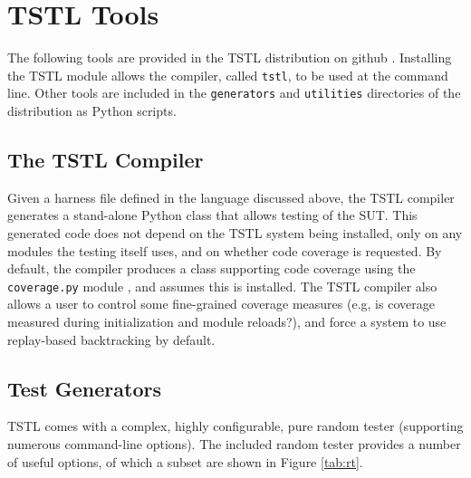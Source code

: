 \section{TSTL Tools}
\label{sec:tools}

The following tools are provided in the TSTL distribution on github \cite{tstl}.  Installing the TSTL module allows the compiler, called {\tt tstl}, to be used at the command line.  Other tools are included in the {\tt generators} and {\tt utilities} directories of the distribution as Python scripts.

\subsection{The TSTL Compiler}

Given a harness file defined in the language discussed above, the TSTL compiler generates a stand-alone Python class that allows testing of the SUT.  This generated code does not depend on the TSTL system being installed, only on any modules the testing itself uses, and on whether code coverage is requested.  By default, the compiler produces a class supporting code coverage using the {\tt coverage.py} module \cite{coveragepy}, and assumes this is installed.  The TSTL compiler also allows a user to control some fine-grained coverage measures (e.g, is coverage measured during initialization and module reloads?), and force a system to use replay-based backtracking by default.

\subsection{Test Generators}

TSTL comes with a complex, highly configurable, pure random tester (supporting numerous command-line options).  The included random tester provides a number of useful options, of which a subset are shown in Figure \ref{tab:rt}.   

